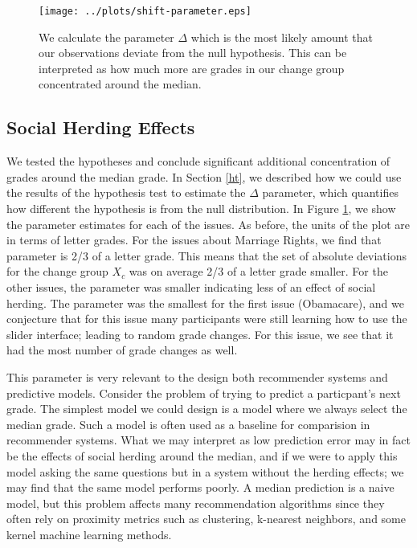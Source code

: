 \begin{figure}[ht!]
\centering
  \hspace{-3em}
    \texttt{[image: ../plots/shift-parameter.eps]}
      \caption{We calculate the parameter $\Delta$ which is the most likely amount that our observations deviate from the null hypothesis. This can be interpreted as how much more are grades in our change group concentrated around the median.}
      \label{shift-1}
\end{figure}
\subsection{Social Herding Effects}
We tested the hypotheses and conclude significant additional concentration of grades around the median grade.
In Section \ref{ht}, we described how we could use the results of the hypothesis test to estimate the $\Delta$ parameter, which quantifies how different the hypothesis is from the null distribution.
In Figure \ref{shift-1}, we show the parameter estimates for each of the issues.
As before, the units of the plot are in terms of letter grades.
For the issues about Marriage Rights, we find that parameter is 2/3 of a letter grade.
This means that the set of absolute deviations for the change group $X_c$ was on average 2/3 of a letter grade smaller.
For the other issues, the parameter was smaller indicating less of an effect of social herding.
The parameter was the smallest for the first issue (Obamacare), and we conjecture that for this issue many participants were still learning how to use the slider interface; leading to random grade changes.
For this issue, we see that it had the most number of grade changes as well.

This parameter is very relevant to the design both recommender systems and predictive models.
Consider the problem of trying to predict a particpant's next grade.
The simplest model we could design is a model where we always select the median grade.
Such a model is often used as a baseline for comparision in recommender systems.
What we may interpret as low prediction error may in fact be the effects of social herding around the median, and if we were to apply this model asking the same questions but in a system without the herding effects; we may find that the same model performs poorly.
A median prediction is a naive model, but this problem affects many recommendation algorithms since they often rely on proximity metrics such as clustering, k-nearest neighbors, and some kernel machine learning methods.
